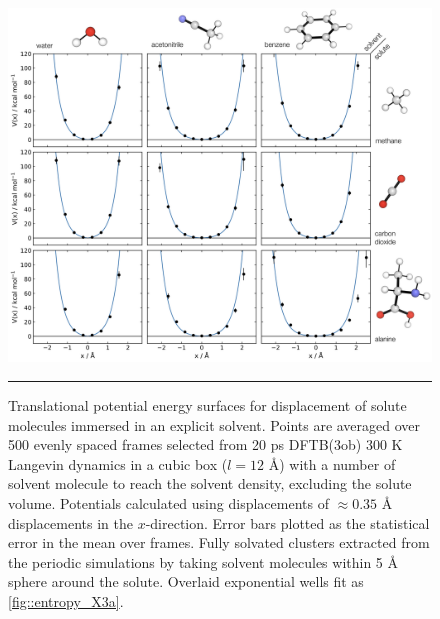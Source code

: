\documentclass[../main.tex]{subfiles}
\begin{document}
\vspace{0.2cm}
\begin{figure}[h!]
	\centering
	\includegraphics[width=14.5cm]{4/figs/figX5/figX5.png}
	\vspace{0.2cm}
	\hrule
	\caption{Translational potential energy surfaces for displacement of solute molecules immersed in an explicit solvent. Points are averaged over 500 evenly spaced frames selected from 20 ps DFTB(3ob) 300 K Langevin dynamics in a cubic box ($l = 12$ \AA) with a number of solvent molecule to reach the solvent density, excluding the solute volume. Potentials calculated using displacements of $\approx 0.35$ \AA$\,$ displacements in the $x$-direction. Error bars plotted as the statistical error in the mean over frames. Fully solvated clusters extracted from the periodic simulations by taking solvent molecules within 5 \AA $\;$ sphere around the solute. Overlaid exponential wells fit as \figurename{ \ref{fig::entropy_X3a}}.}
	\label{fig::entropy_X5}
\end{figure}

\end{document}
